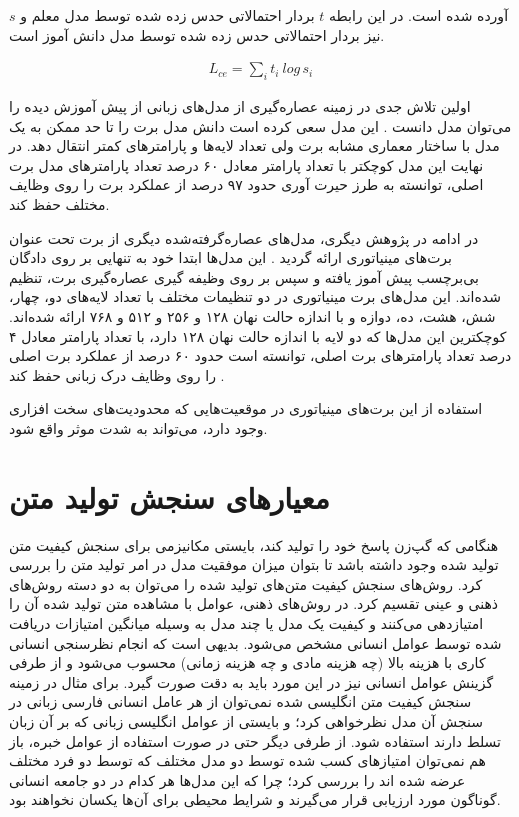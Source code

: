 آورده شده است. در این رابطه $t$ بردار احتمالاتی حدس زده شده توسط مدل معلم و $s$ نیز بردار احتمالاتی حدس زده شده توسط مدل دانش آموز است.

\begin{align} \label{eq:cross_distill}
L_{ce} = \sum_{i}^{} t_i\:log\,s_i
\end{align}

اولین تلاش جدی در زمینه عصاره‌گیری از مدل‌های زبانی از پیش آموزش دیده را می‌توان مدل 
دانست
\cite{sanh2019distilbert}.
این مدل سعی کرده است دانش مدل برت را 
تا حد ممکن به یک مدل با ساختار معماری مشابه برت ولی تعداد  لایه‌ها و پارامتر‌های کمتر انتقال دهد. در نهایت این مدل کوچکتر با تعداد پارامتر معادل ۶۰ درصد تعداد پارامتر‌های مدل برت اصلی،
توانسته به طرز حیرت آوری حدود ۹۷ درصد از عملکرد برت را روی وظایف مختلف حفظ کند. 

در ادامه در پژوهش دیگری، مدل‌های عصاره‌گرفته‌شده دیگری از برت تحت عنوان برت‌های مینیاتوری ارائه گردید
\cite{turc2019well}.
این مدل‌ها ابتدا خود به تنهایی بر روی دادگان بی‌برچسب پیش آموز یافته و سپس بر روی وظیفه گیری عصاره‌گیری برت، تنظیم شده‌اند. این مدل‌های برت مینیاتوری در دو تنظیمات مختلف 
با تعداد لایه‌های دو، چهار، شش، هشت، ده، دوازه و با اندازه حالت نهان ۱۲۸ و ۲۵۶ و ۵۱۲ و ۷۶۸ ارائه شده‌اند. کوچکترین این مدل‌ها که دو لایه با اندازه حالت نهان ۱۲۸ دارد، با تعداد پارامتر معادل ۴ درصد تعداد پارامترهای برت اصلی، توانسته است حدود ۶۰ درصد از عملکرد برت‌ اصلی را روی وظایف درک زبانی حفظ کند
\cite{turc2019well}.

استفاده از این برت‌های مینیاتوری در موقعیت‌هایی که محدودیت‌های سخت افزاری وجود دارد، می‌تواند به شدت موثر واقع شود.

\section{معیارهای سنجش تولید متن}

هنگامی که گپ‌زن پاسخ‌ خود را تولید کند، بایستی مکانیزمی برای سنجش کیفیت متن تولید شده وجود داشته باشد تا بتوان میزان موفقیت مدل در امر تولید متن را بررسی کرد. روش‌های سنجش کیفیت متن‌های تولید شده را 
می‌توان به دو دسته‌ روش‌های ذهنی و عینی تقسیم کرد. در روش‌های ذهنی، عوامل با مشاهده متن تولید شده آن را امتیازدهی می‌کنند و کیفیت یک مدل یا چند مدل به وسیله میانگین امتیازات دریافت شده توسط عوامل انسانی مشخص می‌شود. بدیهی است که انجام نظرسنجی انسانی کاری با هزینه بالا (چه هزینه مادی و چه هزینه زمانی) محسوب می‌شود و از طرفی گزینش عوامل انسانی نیز در این مورد باید به دقت صورت گیرد. برای مثال در زمینه سنجش کیفیت متن انگلیسی شده نمی‌توان از هر عامل انسانی فارسی زبانی در سنجش آن مدل نظرخواهی کرد؛ و بایستی از عوامل انگلیسی زبانی که بر آن زبان تسلط دارند استفاده شود. از طرفی دیگر حتی در صورت استفاده از عوامل خبره، باز هم نمی‌توان امتیازهای کسب شده توسط دو مدل مختلف که توسط دو فرد مختلف عرضه شده اند را بررسی کرد؛ چرا که این مدل‌ها هر کدام در دو جامعه انسانی گوناگون مورد ارزیابی قرار می‌‌گیرند و شرایط محیطی برای آن‌ها یکسان نخواهند بود. 

